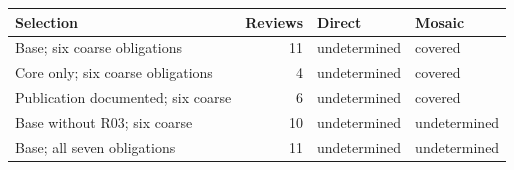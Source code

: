 \begin{tabular}{p{5.1cm}rll}
\toprule
Selection & Reviews & Direct & Mosaic \\
\midrule
Base; six coarse obligations & 11 & undetermined & covered \\
Core only; six coarse obligations & 4 & undetermined & covered \\
Publication documented; six coarse & 6 & undetermined & covered \\
Base without R03; six coarse & 10 & undetermined & undetermined \\
Base; all seven obligations & 11 & undetermined & undetermined \\
\bottomrule
\end{tabular}
